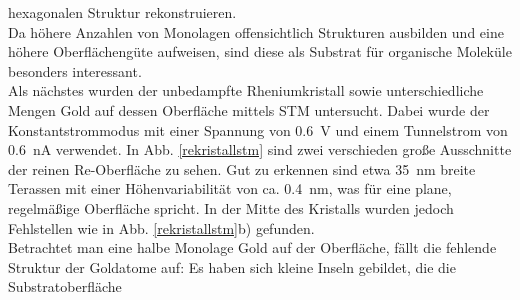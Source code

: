 hexagonalen Struktur rekonstruieren.\\
Da höhere Anzahlen von Monolagen offensichtlich Strukturen ausbilden und eine höhere Oberflächengüte
aufweisen, sind diese als Substrat für organische Moleküle besonders interessant. 
\\
Als nächstes wurden der unbedampfte Rheniumkristall sowie unterschiedliche Mengen Gold auf dessen
Oberfläche mittels STM untersucht. Dabei wurde der Konstantstrommodus mit einer Spannung von
\SI{0,6}{V} und einem Tunnelstrom von \SI{0,6}{nA} verwendet. In Abb. \ref{rekristallstm} sind zwei
verschieden große Ausschnitte der reinen Re-Oberfläche zu sehen. Gut zu erkennen sind etwa
\SI{35}{nm} breite Terassen mit einer Höhenvariabilität von ca. \SI{0,4}{nm}, was für eine plane,
regelmäßige Oberfläche spricht.
In der
Mitte des Kristalls wurden jedoch Fehlstellen wie in Abb. \ref{rekristallstm}b) gefunden.\\
Betrachtet man eine halbe Monolage Gold auf der Oberfläche, fällt die fehlende Struktur der
Goldatome auf: Es haben sich kleine Inseln gebildet, die die Substratoberfläche 


